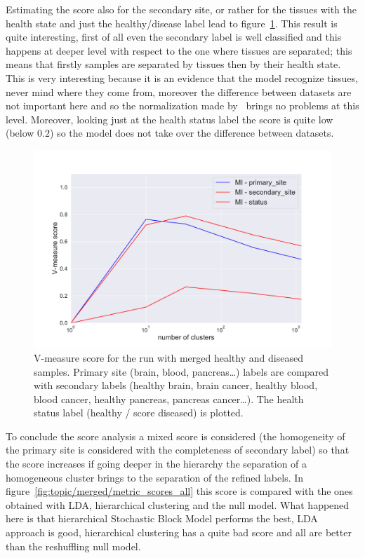 Estimating the score also for the secondary site, or rather for the tissues with the health state and just the healthy/disease label lead to figure~\ref{fig:topic/merged/metric_scores}. This result is quite interesting, first of all even the secondary label is well classified and this happens at deeper level with respect to the one where tissues are separated; this means that firstly samples are separated by tissues then by their health state. This is very interesting because it is an evidence that the model recognize tissues, never mind where they come from, moreover the difference between datasets are not important here and so the normalization made by~\cite{Betel2018} brings no problems at this level. Moreover, looking just at the health status label the score is quite low (below $0.2$) so the model does not take over the difference between datasets.
\begin{figure}[htb!]
    \centering
    \includegraphics[width=0.8\linewidth]{pictures/topic/merged/metric_scores.pdf}
    \caption{V-measure score for the run with merged healthy and diseased samples. Primary site (brain, blood, pancreas\ldots) labels are compared with secondary labels (healthy brain, brain cancer, healthy blood, blood cancer, healthy pancreas, pancreas cancer\ldots). The health status label (healthy / score diseased) is plotted.}
    \label{fig:topic/merged/metric_scores}
\end{figure}
To conclude the score analysis a mixed score is considered (the homogeneity of the primary site is considered with the completeness of secondary label) so that the score increases if going deeper in the hierarchy the separation of a homogeneous cluster brings to the separation of the refined labels. In figure~\ref{fig:topic/merged/metric_scores_all} this score is compared with the ones obtained with LDA, hierarchical clustering and the null model. What happened here is that hierarchical Stochastic Block Model performs the best, LDA approach is good, hierarchical clustering has a quite bad score and all are better than the reshuffling null model.
